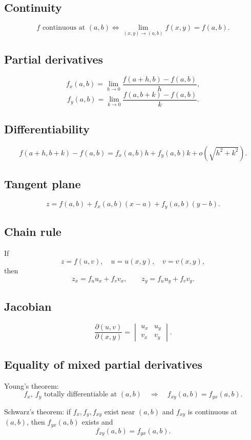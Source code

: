 \documentclass[11pt,oneside]{book}
\theoremstyle{studentthm}
\theoremstyle{definition}
\begin{document}
\subsection*{Continuity}
\[
f\text{ continuous at }(a,b)
\iff
\lim_{(x,y)\to(a,b)}f(x,y)=f(a,b).
\]

\subsection*{Partial derivatives}
\[
f_x(a,b)
=
\lim_{h\to0}
\frac{f(a+h,b)-f(a,b)}{h},
\]
\[
f_y(a,b)
=
\lim_{k\to0}
\frac{f(a,b+k)-f(a,b)}{k}.
\]

\subsection*{Differentiability}
\[
f(a+h,b+k)-f(a,b)
=
f_x(a,b)h+f_y(a,b)k
+
o(\sqrt{h^2+k^2}).
\]

\subsection*{Tangent plane}
\[
z=f(a,b)+f_x(a,b)(x-a)+f_y(a,b)(y-b).
\]

\subsection*{Chain rule}
If
\[
z=f(u,v),\quad u=u(x,y),\quad v=v(x,y),
\]
then
\[
z_x=f_u u_x+f_v v_x,
\qquad
z_y=f_u u_y+f_v v_y.
\]

\subsection*{Jacobian}
\[
\frac{\partial(u,v)}{\partial(x,y)}
=
\begin{vmatrix}
u_x&u_y\\
v_x&v_y
\end{vmatrix}.
\]

\subsection*{Equality of mixed partial derivatives}

Young's theorem:
\[
f_x,\ f_y\text{ totally differentiable at }(a,b)
\quad\Longrightarrow\quad
f_{xy}(a,b)=f_{yx}(a,b).
\]

Schwarz's theorem: if \(f_x,f_y,f_{xy}\) exist near \((a,b)\) and \(f_{xy}\) is continuous at \((a,b)\), then \(f_{yx}(a,b)\) exists and
\[
f_{xy}(a,b)=f_{yx}(a,b).
\]
\end{document}
